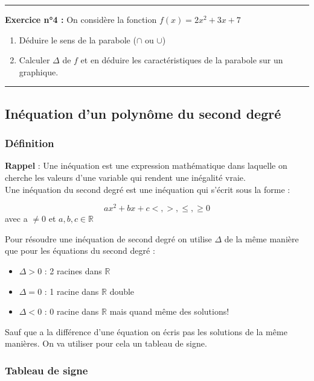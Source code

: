 \documentclass{article} %
\begin{document}
	\rule{\textwidth}{0.4pt}
	\noindent \textbf{Exercice n°4 :}
	On considère la fonction $f(x) = 2x^2 + 3x + 7$
	\begin{enumerate}
	\item Déduire le sens de la parabole ($\cap$ ou $\cup$)
	\item Calculer $\Delta$ de $f$ et en déduire les caractéristiques de la parabole sur un graphique.
	\end{enumerate}
	
	\rule{\textwidth}{0.4pt}
	
	\subsection{Inéquation d'un polynôme du second degré}
	\subsubsection{Définition}
	\textbf{Rappel} : Une inéquation est une expression mathématique dans laquelle on cherche les valeurs d'une variable qui rendent une inégalité vraie.\\
	
	\noindent Une inéquation du second degré est une inéquation qui s'écrit sous la forme :
	
	\[
		ax^2 + bx + c <, >, \leq, \geq 0
	\]
	avec a $\neq 0$ et $a,b,c \in \mathbb{R}$ \\
	
	\newpage
	
	\noindent Pour résoudre une inéquation de second degré on utilise $\Delta$ de la même manière que pour les équations du second degré :
	
	\begin{itemize}
		\item $\Delta > 0$ : 2 racines dans $\mathbb{R}$
		\item $\Delta = 0$ : 1 racine dans $\mathbb{R}$ double
		\item $\Delta < 0$ : 0 racine dans $\mathbb{R}$ mais quand même des solutions!\\
	\end{itemize}
	
	\noindent Sauf que a la différence d'une équation on écris pas les solutions de la même manières. On va utiliser pour cela un tableau de signe.
	
	\subsubsection{Tableau de signe}
	
\end{document}
